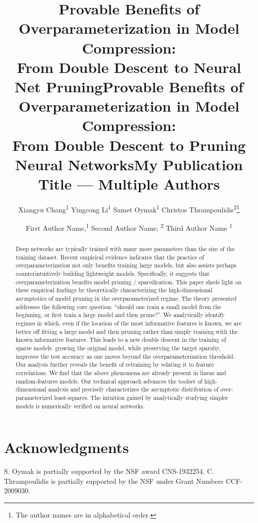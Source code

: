 \documentclass[letterpaper]{article} %
\title{Provable Benefits of Overparameterization in Model Compression:\\From Double Descent to Neural Net Pruning}
\title{Provable Benefits of Overparameterization in Model Compression:\\From Double Descent to Pruning Neural Networks}
\author {
            Xiangyu Chang\textsuperscript{\rm 1}\quad
        Yingcong Li\textsuperscript{\rm 1}\quad
        Samet Oymak\textsuperscript{\rm 1} \quad
        Christos Thrampoulidis\textsuperscript{\rm 2}\footnote{The author names are in alphabetical order.}\\
}
\title{My Publication Title --- Multiple Authors}
\author {

        First Author Name,\textsuperscript{\rm 1}
        Second Author Name, \textsuperscript{\rm 2}
        Third Author Name \textsuperscript{\rm 1} \\
}
\begin{document}
\maketitle
\begin{abstract}
Deep networks are typically trained with many more parameters than the size of the training dataset. Recent empirical evidence indicates that the practice of overparameterization not only benefits training large models, but also assists  perhaps counterintuitively  building lightweight models. Specifically, it suggests that overparameterization benefits model pruning / sparsification. This paper sheds light on these empirical findings by theoretically characterizing the high-dimensional asymptotics of model pruning in the overparameterized regime. The theory presented addresses the following core question: ``should one train a small model from the beginning, or first train a large model and then prune?''. We analytically identify regimes in which, even if the location of the most informative features is known, we are better off fitting a large model and then pruning rather than simply training with the known informative features. This leads to a new double descent in the training of sparse models: growing the original model, while preserving the target sparsity, improves the test accuracy as one moves beyond the overparameterization threshold. Our analysis further reveals the benefit of retraining by relating it to feature correlations. We find that the above phenomena are already present in linear and random-features models. Our technical approach advances the toolset of high-dimensional analysis and precisely characterizes the asymptotic distribution of over-parameterized least-squares. The intuition gained by analytically studying simpler models is numerically verified on neural networks.
\end{abstract}















\section*{Acknowledgments}
S. Oymak is partially supported by the NSF award CNS-1932254. C. Thrampoulidis is partially supported by the NSF under Grant Numbers CCF-2009030.
\end{document}
